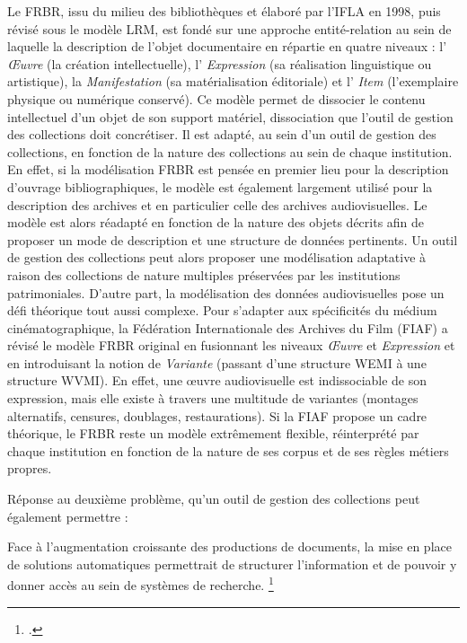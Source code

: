 Le FRBR, issu du milieu des bibliothèques et élaboré par l'IFLA en 1998, puis révisé sous le modèle LRM, est fondé sur une approche entité-relation au sein de laquelle la description de l'objet documentaire en répartie en quatre niveaux : l' \textit{Œuvre} (la création intellectuelle), l' \textit{Expression} (sa réalisation linguistique ou artistique), la \textit{Manifestation} (sa matérialisation éditoriale) et l' \textit{Item} (l'exemplaire physique ou numérique conservé). Ce modèle permet de dissocier le contenu intellectuel d'un objet de son support matériel, dissociation que l'outil de gestion des collections doit concrétiser. Il est adapté, au sein d'un outil de gestion des collections, en fonction de la nature des collections au sein de chaque institution. En effet, si la modélisation FRBR est pensée en premier lieu pour la description d'ouvrage bibliographiques, le modèle est également largement utilisé pour la description des archives et en particulier celle des archives audiovisuelles. Le modèle est alors réadapté en fonction de la nature des objets décrits afin de proposer un mode de description et une structure de données pertinents. Un outil de gestion des collections peut alors proposer une modélisation adaptative à raison des collections de nature multiples préservées par les institutions patrimoniales. 
D'autre part, la modélisation des données audiovisuelles pose un défi théorique tout aussi complexe. Pour s'adapter aux spécificités du médium cinématographique, la Fédération Internationale des Archives du Film (FIAF) a révisé le modèle FRBR original en fusionnant les niveaux \textit{Œuvre} et \textit{Expression} et en introduisant la notion de \textit{Variante} (passant d'une structure WEMI à une structure WVMI). En effet, une œuvre audiovisuelle est indissociable de son expression, mais elle existe à travers une multitude de variantes (montages alternatifs, censures, doublages, restaurations). Si la FIAF propose un cadre théorique, le FRBR reste un modèle extrêmement flexible, réinterprété par chaque institution en fonction de la nature de ses corpus et de ses règles métiers propres.

Réponse au deuxième problème, qu'un outil de gestion des collections peut également permettre : 

Face à l'augmentation croissante des productions de documents, la mise en place de solutions automatiques permettrait de structurer l'information et de pouvoir y donner accès au sein de systèmes de recherche. \footcite{barreaux2017} 

